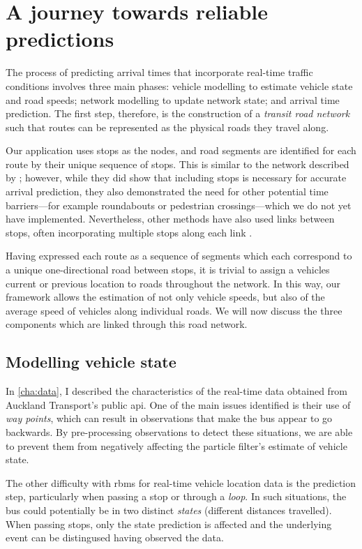 \section{A journey towards reliable predictions}

The process of predicting arrival times that incorporate real-time traffic conditions involves three main phases: vehicle modelling to estimate vehicle state and road speeds; network modelling to update network state; and arrival time prediction. The first step, therefore, is the construction of a \emph{transit road network} such that routes can be represented as the physical roads they travel along.


Our application uses stops as the nodes, and road segments are identified for each route by their unique sequence of stops. This is similar to the network described by \citet{Celan_2018,Celan_2017}; however, while they did show that including stops is necessary for accurate arrival prediction, they also demonstrated the need for other potential time barriers---for example roundabouts or pedestrian crossings---which we do not yet have implemented. Nevertheless, other methods have also used links between stops, often incorporating multiple stops along each link \citep{cn}.


Having expressed each route as a sequence of segments which each correspond to a unique one-directional road between stops, it is trivial to assign a vehicles current or previous location to roads throughout the network. In this way, our framework allows the estimation of not only vehicle speeds, but also of the average speed of vehicles along individual roads. We will now discuss the three components which are linked through this road network.



\subsection{Modelling vehicle state}

In \cref{cha:data}, I described the characteristics of the real-time data obtained from Auckland Transport's public \gls{api}. One of the main issues identified is their use of \emph{way points}, which can result in observations that make the bus appear to go backwards. By pre-processing observations to detect these situations, we are able to prevent them from negatively affecting the particle filter's estimate of vehicle state.


The other difficulty with \glspl{rbm} for real-time vehicle location data is the prediction step, particularly when passing a stop or through a \emph{loop}. In such situations, the bus could potentially be in two distinct \emph{states} (different distances travelled). When passing stops, only the state prediction is affected and the underlying event can be distingused having observed the data.

